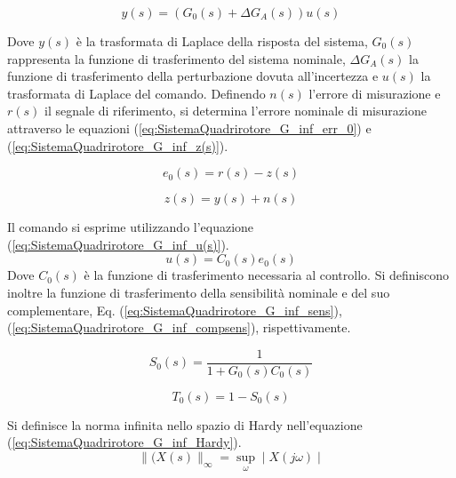 \begin{equation}\label{eq:SistemaQuadrirotore_G_inf_TF}
	y(s) = \left(G_0(s) + \Delta G_A(s)\right) u(s) 
\end{equation}

Dove $y(s)$ è la trasformata di Laplace della risposta del sistema, $G_0(s)$ rappresenta la funzione di trasferimento del sistema nominale, $\Delta G_A(s)$ la funzione di trasferimento della perturbazione dovuta all'incertezza e $u(s)$ la trasformata di Laplace del comando.
Definendo $n(s)$ l'errore di misurazione e $r(s)$ il segnale di riferimento, si determina l'errore nominale di misurazione attraverso le equazioni (\ref{eq:SistemaQuadrirotore_G_inf_err_0}) e (\ref{eq:SistemaQuadrirotore_G_inf_z(s)}).

\begin{equation}\label{eq:SistemaQuadrirotore_G_inf_err_0}
	e_0(s) = r(s) -z(s)
\end{equation}

\begin{equation}\label{eq:SistemaQuadrirotore_G_inf_z(s)}
	z(s) = y(s) + n(s)
\end{equation}

Il comando si esprime utilizzando l'equazione (\ref{eq:SistemaQuadrirotore_G_inf_u(s)}).
\begin{equation}\label{eq:SistemaQuadrirotore_G_inf_u(s)}
	u(s) = C_0(s) e_0(s)
\end{equation}
Dove $C_0(s)$ è la funzione di trasferimento necessaria al controllo.
Si definiscono inoltre la funzione di trasferimento della sensibilità nominale e del suo complementare, Eq. (\ref{eq:SistemaQuadrirotore_G_inf_sens}), (\ref{eq:SistemaQuadrirotore_G_inf_compsens}), rispettivamente.

\begin{equation}\label{eq:SistemaQuadrirotore_G_inf_sens}
	S_0(s) = \frac{1}{1+ G_0(s) C_0(s)}
\end{equation}

\begin{equation}\label{eq:SistemaQuadrirotore_G_inf_compsens}
	T_0(s) = 1- S_0(s)
\end{equation}

Si definisce la norma infinita nello spazio di Hardy nell'equazione (\ref{eq:SistemaQuadrirotore_G_inf_Hardy}).
\begin{equation}\label{eq:SistemaQuadrirotore_G_inf_Hardy}
	\|(X(s)\|_\infty = \sup_\omega \mid X(j \omega) \mid
\end{equation}

